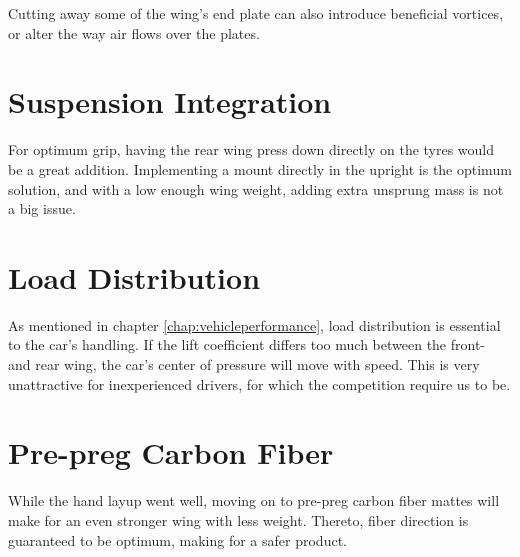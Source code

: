Cutting away some of the wing's end plate can also introduce beneficial vortices, or alter the way air flows over the plates. 

\section{Suspension Integration}

For optimum grip, having the rear wing press down directly on the tyres would be a great addition. Implementing a mount directly in the upright is the optimum solution, and with a low enough wing weight, adding extra unsprung mass is not a big issue.

\section{Load Distribution}

As mentioned in chapter \ref{chap:vehicleperformance}, load distribution is essential to the car's handling. If the lift coefficient differs too much between the front- and rear wing, the car's center of pressure will move with speed. This is very unattractive for inexperienced drivers, for which the competition require us to be.

\section{Pre-preg Carbon Fiber}

While the hand layup went well, moving on to pre-preg carbon fiber mattes will make for an even stronger wing with less weight. Thereto, fiber direction is guaranteed to be optimum, making for a safer product.
